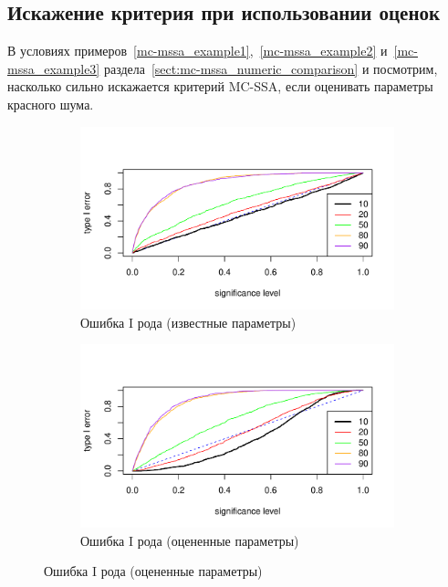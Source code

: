 \documentclass[specialist,
substylefile = spbu.rtx,
               subf,href,colorlinks=true, 12pt]{disser}
\theoremstyle{definition}
\begin{document}
\subsection{Искажение критерия при использовании оценок}\label{sect:mc-ssa_est}
В условиях примеров~\ref{mc-mssa_example1},~\ref{mc-mssa_example2} и~\ref{mc-mssa_example3} раздела~\ref{sect:mc-mssa_numeric_comparison} и посмотрим, насколько сильно искажается критерий MC-SSA, если оценивать параметры красного шума.
\begin{figure}[h!]
	\captionsetup[subfigure]{justification=Centering}
	\begin{subfigure}[t]{0.5\textwidth}
		\centering
		\includegraphics[width=\textwidth]{img/type1error_phi7.pdf}
		\caption{Ошибка I рода (известные параметры)}
		\label{fig:type1error_phi7}
	\end{subfigure}\hspace{\fill}
	\begin{subfigure}[t]{0.5\textwidth}
		\centering
		\includegraphics[width=\textwidth]{img/type1error_phi7est.pdf}
		\caption{Ошибка I рода (оцененные параметры)}

\end{subfigure}
\end{figure}
\end{document}
